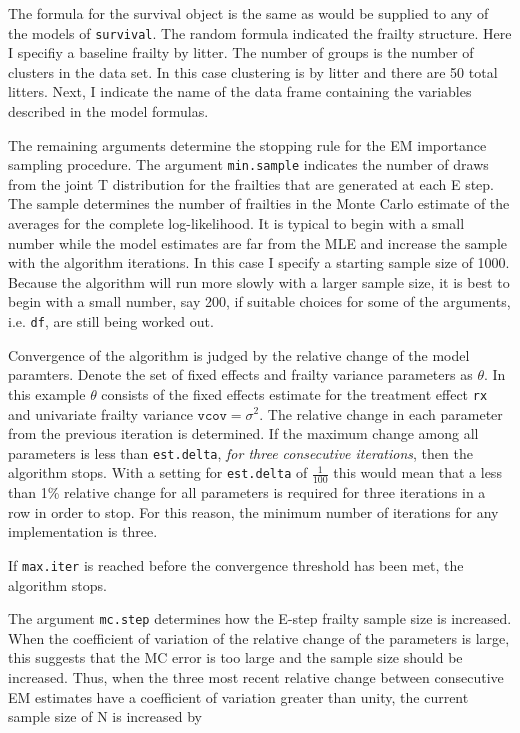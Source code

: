 The formula for the survival object is the same as would be supplied
to any of the models of \texttt{survival}. The random formula
indicated the frailty structure. Here I specifiy a baseline frailty
by litter. The number of groups is the number of clusters in the data
set. In this case clustering is by litter and there are 50 total
litters. Next, I indicate the name of the data frame containing the
variables described in the model formulas.

The remaining arguments determine the stopping rule for the EM
importance sampling procedure. The argument \texttt{min.sample}
indicates the number of draws from the joint T distribution for the
frailties that are generated at each E step. The sample determines the
number of frailties in the Monte Carlo estimate of the averages for
the complete log-likelihood. It is typical to begin with a small
number while the model estimates are far from the MLE and increase the
sample with the algorithm iterations. In this case I specify a
starting sample size of 1000. Because the algorithm will run more
slowly with a larger sample size, it is best to begin with a small
number, say 200, if suitable choices for some of the arguments,
i.e. \texttt{df}, are still being worked out.

Convergence of the algorithm is judged by the relative change of the
model paramters. Denote the set of fixed effects and frailty variance
parameters as $\theta$. In this example $\theta$ consists of the fixed
effects estimate for the treatment effect \texttt{rx} and univariate
frailty variance $\texttt{vcov} = \sigma^2$. The relative change in each parameter from the
previous iteration is determined. If the maximum change among all
parameters is less than \texttt{est.delta}, \emph{for three
  consecutive iterations}, then the algorithm
stops. With a setting for \texttt{est.delta} of $\frac{1}{100}$ this
would mean that a less than 1\% relative change for all parameters is
required for three iterations in a row in order to stop. For this
reason, the minimum number of iterations for any implementation is three.

If \texttt{max.iter} is reached before the convergence threshold has
been met, the algorithm stops.

The argument \texttt{mc.step} determines how the E-step frailty sample
size is increased. When the coefficient of variation of the relative
change of the parameters is large, this suggests that the MC error is
too large and the sample size should be increased. Thus, when the
three most recent relative change between consecutive EM estimates
have a coefficient of variation greater than unity, the current sample
size of N is increased by 

